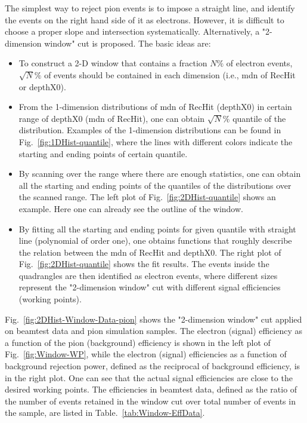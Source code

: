 The simplest way to reject pion events is to impose a straight line, and identify the events on the right hand side of it as electrons. However, it is difficult to choose a proper slope and intersection systematically.
Alternatively, a "2-dimension window" cut is proposed. The basic ideas are:
\begin{itemize}  
\item To construct a 2-D window that contains a fraction $N\%$ of electron events, $\sqrt{N}\%$ of events should be contained in each dimension (i.e.,  mdn of RecHit or depthX0).
\item From the 1-dimension distributions of mdn of RecHit (depthX0) in certain range of depthX0 (mdn of RecHit), one can obtain $\sqrt{N}\%$ quantile of the distribution. Examples of the 1-dimension distributions can be found in Fig.~\ref{fig:1DHist-quantile}, where the lines with different colors indicate the starting and ending points of certain quantile.
\item By scanning over the range where there are enough statistics, one can obtain all the starting and ending points of the quantiles of the distributions over the scanned range. The left plot of Fig.~\ref{fig:2DHist-quantile} shows an example. Here one can already see the outline of the window.
\item By fitting all the starting and ending points for given quantile with straight line (polynomial of order one), one obtains functions that roughly describe the relation between the mdn of RecHit and depthX0. The right plot of Fig.~\ref{fig:2DHist-quantile} shows the fit results. The events inside the quadrangles are then identified as electron events, where different sizes represent the "2-dimension window" cut with different signal efficiencies (working points).
\end{itemize}

Fig.~\ref{fig:2DHist-Window-Data-pion} shows the "2-dimension window" cut applied on beamtest data and pion simulation samples. The electron (signal) efficiency as a function of the pion (background) efficiency is shown in the left plot of Fig.~\ref{fig:Window-WP}, while the electron (signal) efficiencies as a function of background rejection power, defined as the reciprocal of background efficiency, is in the right plot. One can see that the actual signal efficiencies are close to the desired working points. The efficiencies in beamtest data, defined as the ratio of the number of events retained in the window cut over total number of events in the sample, are listed in Table.~\ref{tab:Window-EffData}.

